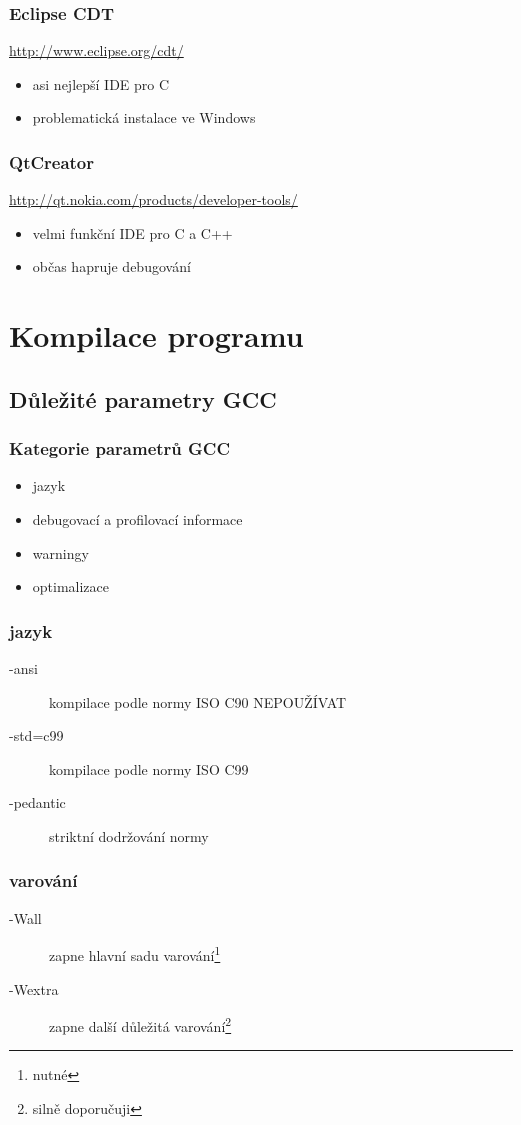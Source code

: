 	\begin{frame}
		\frametitle{Eclipse CDT}
		\url{http://www.eclipse.org/cdt/}
		\begin{itemize}
			\item{asi nejlepší IDE pro C}
			\item{problematická instalace ve Windows}
		\end{itemize}
	\end{frame}

	\begin{frame}
		\frametitle{QtCreator}
		\url{http://qt.nokia.com/products/developer-tools/}
		\begin{itemize}
			\item{velmi funkční IDE pro C a C++}
			\item{občas hapruje debugování}
		\end{itemize}
	\end{frame}

	\section{Kompilace programu}
	\subsection{Důležité parametry GCC}

	\begin{frame}
		\frametitle{Kategorie parametrů GCC}
		\begin{itemize}
			\item{jazyk}
			\item{debugovací a profilovací informace}
			\item{warningy}
			\item{optimalizace}
		\end{itemize}
	\end{frame}

	\begin{frame}
		\frametitle{jazyk}
		\begin{description}
			\item[-ansi]{kompilace podle normy ISO C90 \alert{NEPOUŽÍVAT}}
			\item[-std=c99]{kompilace podle normy ISO C99}
			\item[-pedantic]{striktní dodržování normy}
		\end{description}
	\end{frame}

	\begin{frame}
		\frametitle{varování}
		\begin{description}
			\item[-Wall]{zapne hlavní sadu varování\footnote{\alert{nutné}}}
			\item[-Wextra]{zapne další důležitá varování\footnote{silně doporučuji}} 
		\end{description}
	\end{frame}

